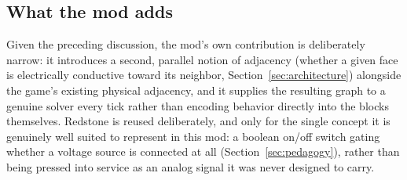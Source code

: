 \subsection{What the mod adds}

Given the preceding discussion, the mod's own contribution is deliberately narrow: it
introduces a second, parallel notion of adjacency (whether a given face is electrically
conductive toward its neighbor, Section~\ref{sec:architecture}) alongside the game's
existing physical adjacency, and it supplies the resulting graph to a genuine solver every
tick rather than encoding behavior directly into the blocks themselves. Redstone is reused
deliberately, and only for the single concept it is genuinely well suited to represent in
this mod: a boolean on/off switch gating whether a voltage source is connected at all
(Section~\ref{sec:pedagogy}), rather than being pressed into service as an analog signal it
was never designed to carry.

